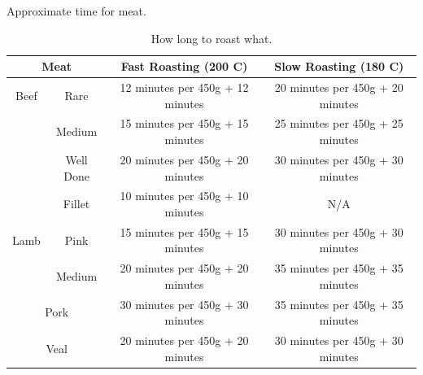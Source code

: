 \documentclass[18pt, oneside]{book}
\begin{document}
\begin{appendices}
Approximate time for meat. 

 \begin{table}[h!]
 \centering
 \begin{tabular}{|c|c|c|c|}
\hline
\multicolumn{2}{|c|}{Meat} & Fast Roasting (200 C) & Slow Roasting (180 C)\\
\hline
Beef & Rare & 12 minutes per 450g + 12 minutes & 20 minutes per 450g + 20 minutes \\
 & Medium & 15 minutes per 450g + 15 minutes & 25 minutes per 450g + 25 minutes \\
 & Well Done & 20 minutes per 450g + 20 minutes & 30 minutes per 450g + 30 minutes \\
 
  & Fillet & 10 minutes per 450g + 10 minutes & N/A \\
\hline
Lamb & Pink & 15 minutes per 450g + 15 minutes & 30 minutes per 450g + 30 minutes \\
  & Medium & 20 minutes per 450g + 20 minutes & 35 minutes per 450g + 35 minutes \\
\hline
\multicolumn{2}{|c|}{Pork}  & 30 minutes per 450g + 30 minutes & 35 minutes per 450g + 35 minutes \\
\hline
\multicolumn{2}{|c|}{Veal}  & 20 minutes per 450g + 20 minutes & 30 minutes per 450g + 30 minutes \\
\hline
\end{tabular}
 \caption{How long to roast what.}
 \end{table}
 


\end{appendices}
 
\end{document}
